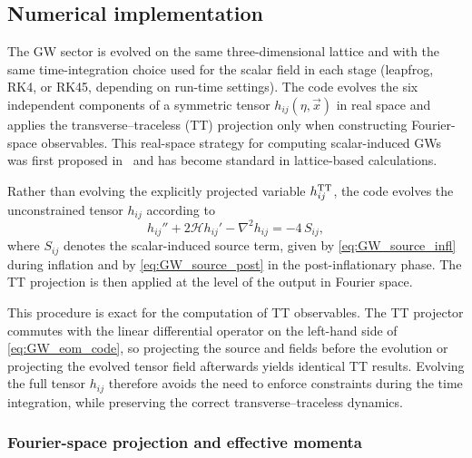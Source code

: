 \documentclass[aps, nofootinbib,superscriptaddress, preprintnumbers, longbibliography]{article}
\begin{document}
\subsection{Numerical implementation}
\label{sec:GW_numerics}

The GW sector is evolved on the same three-dimensional lattice and with the same time-integration choice used for the scalar field in each stage (leapfrog, RK4, or RK45, depending on run-time settings). The code evolves the six independent components of a symmetric tensor $h_{ij}(\eta,\vec{x})$ in real space and applies the transverse--traceless (TT) projection only when constructing Fourier-space observables. This real-space strategy for computing scalar-induced GWs was first proposed in~\cite{Garcia-Bellido:2007fiu} and has become standard in lattice-based calculations. 

Rather than evolving the explicitly projected variable $h_{ij}^{\rm TT}$, the code evolves the unconstrained tensor $h_{ij}$ according to
\begin{equation}
\label{eq:GW_eom_code}
h_{ij}'' + 2\mathcal{H} h_{ij}' - \nabla^2 h_{ij}
=
-4\,S_{ij},
\end{equation}
where $S_{ij}$ denotes the scalar-induced source term, given by \cref{eq:GW_source_infl} during inflation and by \cref{eq:GW_source_post} in the post-inflationary phase. The TT projection is then applied at the level of the output in Fourier space.

This procedure is exact for the computation of TT observables. The TT projector commutes with the linear differential operator on the left-hand side of \cref{eq:GW_eom_code}, so projecting the source and fields before the evolution or projecting the evolved tensor field afterwards yields identical TT results. Evolving the full tensor $h_{ij}$ therefore avoids the need to enforce constraints during the time integration, while preserving the correct transverse--traceless dynamics.


\subsubsection*{Fourier-space projection and effective momenta}
\end{document}
